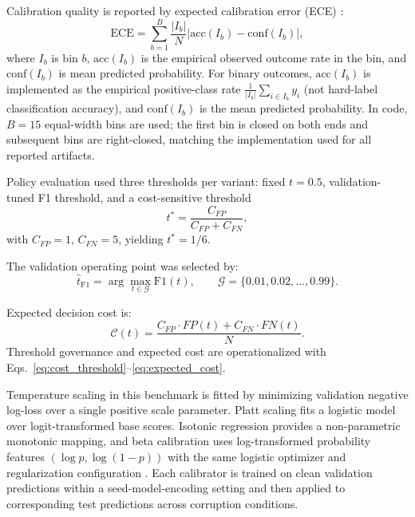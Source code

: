 \documentclass{AuthorGuide/ijitcs}
\begin{document}
Calibration quality is reported by expected calibration error (ECE) \cite{naeini2015bbq,guo2017calibration}:
\begin{equation}
\mathrm{ECE}
=
\sum_{b=1}^{B}\frac{|I_b|}{N}
\left|
\mathrm{acc}(I_b)-\mathrm{conf}(I_b)
\right|,
\label{eq:ece}
\end{equation}
where $I_b$ is bin $b$, $\mathrm{acc}(I_b)$ is the empirical observed outcome rate in the bin, and $\mathrm{conf}(I_b)$ is mean predicted probability.
For binary outcomes, $\mathrm{acc}(I_b)$ is implemented as the empirical positive-class rate $\frac{1}{|I_b|}\sum_{i\in I_b} y_i$ (not hard-label classification accuracy), and $\mathrm{conf}(I_b)$ is the mean predicted probability.
In code, $B=15$ equal-width bins are used; the first bin is closed on both ends and subsequent bins are right-closed, matching the implementation used for all reported artifacts.

Policy evaluation used three thresholds per variant: fixed $t=0.5$, validation-tuned F1 threshold, and a cost-sensitive threshold
\begin{equation}
t^*=\frac{C_{FP}}{C_{FP}+C_{FN}},
\label{eq:cost_threshold}
\end{equation}
with $C_{FP}=1$, $C_{FN}=5$, yielding $t^*=1/6$.

The validation operating point was selected by:
\begin{equation}
\hat{t}_{\mathrm{F1}}
=
\arg\max_{t\in\mathcal{G}} \mathrm{F1}(t),
\qquad
\mathcal{G}=\{0.01,0.02,\ldots,0.99\}.
\label{eq:f1_threshold}
\end{equation}

Expected decision cost is:
\begin{equation}
\mathcal{C}(t)=\frac{C_{FP}\cdot FP(t)+C_{FN}\cdot FN(t)}{N}.
\label{eq:expected_cost}
\end{equation}
Threshold governance and expected cost are operationalized with Eqs.~\eqref{eq:cost_threshold}--\eqref{eq:expected_cost}.

Temperature scaling in this benchmark is fitted by minimizing validation negative log-loss over a single positive scale parameter. Platt scaling fits a logistic model over logit-transformed base scores. Isotonic regression provides a non-parametric monotonic mapping, and beta calibration uses log-transformed probability features $(\log p,\log(1-p))$ with the same logistic optimizer and regularization configuration \cite{kull2017beta}. Each calibrator is trained on clean validation predictions within a seed-model-encoding setting and then applied to corresponding test predictions across corruption conditions.
\end{document}
